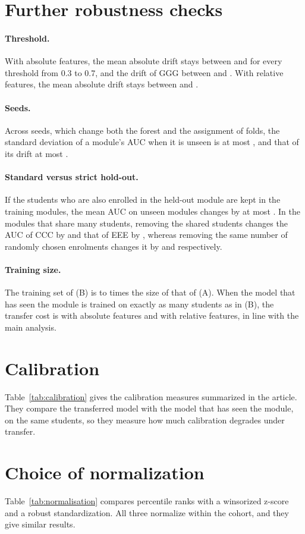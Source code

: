 \documentclass[10pt]{article}
\newcommand{\cA}{(A)}
\newcommand{\cB}{(B)}
\begin{document}


\section{Further robustness checks}
\paragraph{Threshold.} With absolute features, the mean absolute drift stays between \resThrDriftAbsMin{} and \resThrDriftAbsMax{} for every threshold from 0.3 to 0.7, and the drift of GGG between \resThrGGGAbsMin{} and \resThrGGGAbsMax. With relative features, the mean absolute drift stays between \resThrDriftRelMin{} and \resThrDriftRelMax.

\paragraph{Seeds.} Across \resNSeeds{} seeds, which change both the forest and the assignment of folds, the standard deviation of a module's AUC when it is unseen is at most \resSeedSdAucMax{}, and that of its drift at most \resSeedSdDriftMax.

\paragraph{Standard versus strict hold-out.} If the students who are also enrolled in the held-out module are kept in the training modules, the mean AUC on unseen modules changes by at most \resOverlapMeanDiffMax. In the modules that share many students, removing the shared students changes the AUC of CCC by \resOverlapEffectCCC{} and that of EEE by \resOverlapEffectEEE, whereas removing the same number of randomly chosen enrolments changes it by \resOverlapRandomCCC{} and \resOverlapRandomEEE{} respectively.

\paragraph{Training size.} The training set of \cB{} is \resSizeRatioMin{} to \resSizeRatioMax{} times the size of that of \cA. When the model that has seen the module is trained on exactly as many students as in \cB, the transfer cost is \resSizeCostAbs{} with absolute features and \resSizeCostRel{} with relative features, in line with the main analysis.

\section{Calibration}
Table~\ref{tab:calibration} gives the calibration measures summarized in the article. They compare the transferred model with the model that has seen the module, on the same students, so they measure how much calibration degrades under transfer.



\section{Choice of normalization}
Table~\ref{tab:normalisation} compares percentile ranks with a winsorized z-score and a robust standardization. All three normalize within the cohort, and they give similar results.


\end{document}
